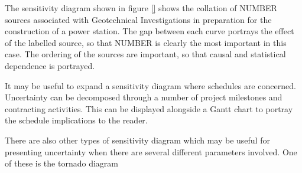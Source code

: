 The sensitivity diagram shown in figure \ref{} shows the collation of NUMBER sources associated with Geotechnical Investigations in preparation for the construction of a power station.
The gap between each curve portrays the effect of the labelled source, so that NUMBER is clearly the most important in this case. The ordering of the sources are important, so that causal and statistical dependence is portrayed.


It may be useful to expand a sensitivity diagram where schedules are concerned. 
Uncertainty can be decomposed through a number of project milestones and contracting activities.
This can be displayed alongside a Gantt chart to portray the schedule implications to the reader.


There are also other types of sensitivity diagram which may be useful for presenting uncertainty when there are several different parameters involved. 
One of these is the tornado diagram





